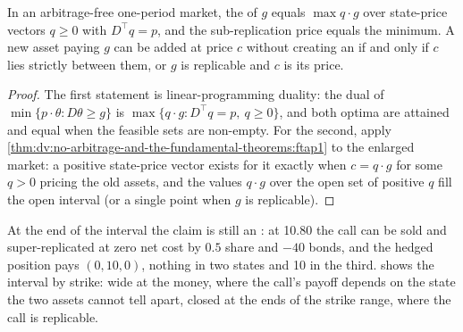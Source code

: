 \begin{proposition}\label{prop:dv:no-arbitrage-and-the-fundamental-theorems:interval}
In an arbitrage-free one-period market, the  of $g$ equals
$\max q\cdot g$ over state-price vectors $q\ge0$ with $D^\top q=p$, and the
sub-replication price equals the minimum. A new asset paying $g$ can be added at
price $c$ without creating an  if and only if $c$ lies strictly between
them, or $g$ is replicable and $c$ is its price.
\end{proposition}
\begin{proof}
The first statement is linear-programming duality: the dual of $\min\{p\cdot
\theta:D\theta\ge g\}$ is $\max\{q\cdot g:D^\top q=p,\ q\ge0\}$, and both optima
are attained and equal when the feasible sets are non-empty. For the second,
apply \cref{thm:dv:no-arbitrage-and-the-fundamental-theorems:ftap1} to the
enlarged market: a positive state-price vector exists for it exactly when
$c=q\cdot g$ for some $q>0$ pricing the old assets, and the values $q\cdot g$ over
the open set of positive $q$ fill the open interval (or a single point when $g$
is replicable).
\end{proof}

At the end of the interval the claim is still an : at 10.80 the call
can be sold and super-replicated at zero net cost by $0.5$ share and $-40$
bonds, and the hedged position pays $(0,10,0)$, nothing in two states and 10 in
the third.  shows
the interval by strike: wide at the money, where the call's payoff depends on
the state the two assets cannot tell apart, closed at the ends of the strike
range, where the call is replicable.


